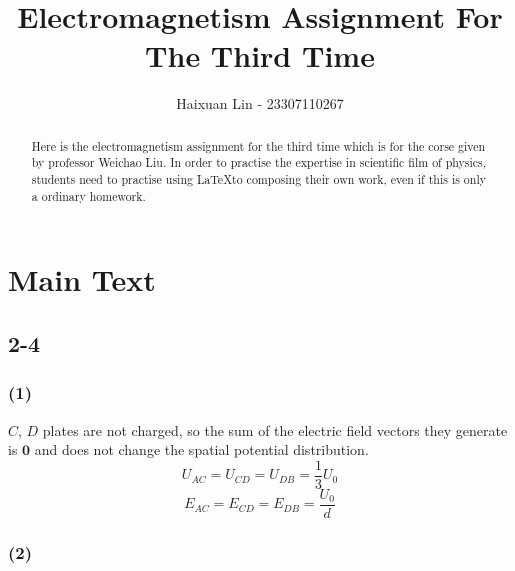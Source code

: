 \documentclass[a4paper,11pt]{amsart}
\title{Electromagnetism Assignment For The Third Time}
\author{Haixuan Lin - 23307110267}
\theoremstyle{definition}
\begin{document}
	
	\begin{abstract}
		Here is the electromagnetism assignment for the third time which is for the corse given by professor Weichao Liu. In order to practise the expertise in scientific film of physics, students need to practise using \LaTeX to composing their own work, even if this is only a ordinary homework.
	\end{abstract}
	
	\maketitle
	
	\section*{Main Text}
		
	\subsection*{2-4}
	\subsubsection*{(1)}
	$C$, $D$ plates are not charged, so the sum of the electric field vectors they generate is $\bm{0}$ and does not change the spatial potential distribution.
	$$
	U_{AC}=U_{CD}=U_{DB}=\frac{1}{3}U_0
	$$
	$$
	E_{AC}=E_{CD}=E_{DB}=\frac{U_0}{d}
	$$
	\subsubsection*{(2)}
	
\end{document}
